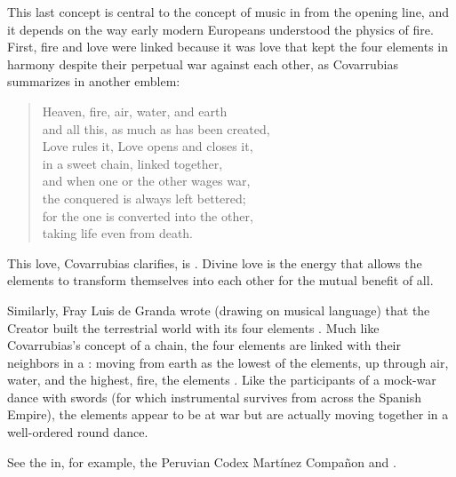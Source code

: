 This last concept is central to the concept of music in  from the opening line, and it depends on the way early
modern Europeans understood the physics of fire.
First, fire and love were linked because it was love that kept the four
elements in harmony despite their perpetual war against each other, as
Covarrubias summarizes in another emblem:
\begin{quoting}
    \begin{verse}
        Heaven, fire, air, water, and earth\\
        and all this, as much as has been created,\\
        Love rules it, Love opens and closes it,\\
        in a sweet chain, linked together,\\
        and when one or the other wages war,\\
        the conquered is always left bettered;\\
        for the one is converted into the other,\\
        taking life even from death.%
            \Autocite[ I, ]
            {Covarrubias:Emblemas}
    \end{verse}
\end{quoting}
This love, Covarrubias clarifies, is .
Divine love is the energy that allows the elements to transform themselves into
each other for the mutual benefit of all.

Similarly, Fray Luis de Granda wrote (drawing on musical language) that the
Creator built the terrestrial world with its four elements .%
    \Autocite[204]{LuisdeGranada:Simbolo}
Much like Covarrubias's concept of a chain, the four elements are linked with
their neighbors in a : moving from
earth as the lowest of the elements, up through air, water, and the highest,
fire, the elements .
    \Autocite[204]{LuisdeGranada:Simbolo}
Like the participants of a mock-war dance with swords (for which instrumental
survives from across the Spanish Empire), the elements appear to be at war but
are actually moving together in a well-ordered round dance.%
\begin{Footnote}
    See the  in, for example, the Peruvian Codex
    Martínez Compañon and \autocite{MartinyColl:HuertoAmeno}.
\end{Footnote}

